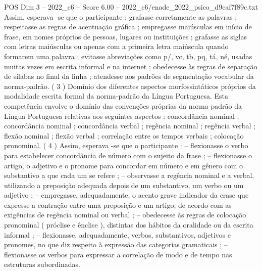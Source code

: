 \begin{textsample}{POS Dim 3 – 2022\_c6 – Score 6.00 – 2022\_c6/enade\_2022\_psico\_d9caf7f89c.txt}
Assim, esperava -se que o participante : grafasse corretamente as palavras ; respeitasse as regras de acentuação gráfica ; empregasse maiúsculas em início de frase, em nomes próprios de pessoas, lugares ou instituições ; grafasse as siglas com letras maiúsculas ou apenas com a primeira letra maiúscula quando formarem uma palavra ; evitasse abreviações como p/, vc, tb, pq, tá, né, usadas muitas vezes em escrita informal e na internet ; obedecesse às regras de separação de sílabas no final da linha ; atendesse aos padrões de segmentação vocabular da norma-padrão. ( 3 ) Domínio dos diferentes aspectos morfossintáticos próprios da modalidade escrita formal da norma-padrão da Língua Portuguesa.
Esta competência envolve o domínio das convenções próprias da norma padrão da Língua Portuguesa relativas aos seguintes aspectos : concordância nominal ; concordância nominal ; concordância verbal ; regência nominal ; regência verbal ; flexão nominal ; flexão verbal ; correlação entre os tempos verbais ; colocação pronominal. ( 4 ) Assim, esperava -se que o participante : – flexionasse o verbo para estabelecer concordância de número com o sujeito da frase ; – flexionasse o artigo, o adjetivo e o pronome para concordar em número e em gênero com o substantivo a que cada um se refere ; – observasse a regência nominal e a verbal, utilizando a preposição adequada depois de um substantivo, um verbo ou um adjetivo ; – empregasse, adequadamente, o acento grave indicador da crase que expresse a contração entre uma preposição e um artigo, de acordo com as exigências de regência nominal ou verbal ; – obedecesse às regras de colocação pronominal ( próclise e ênclise ), distintas dos hábitos da oralidade ou da escrita informal ; – flexionasse, adequadamente, verbos, substantivos, adjetivos e pronomes, no que diz respeito à expressão das categorias gramaticais ; – flexionasse os verbos para expressar a correlação de modo e de tempo nas estruturas subordinadas.

\end{textsample}
